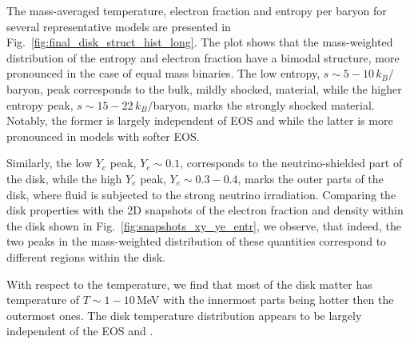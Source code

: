 %
The mass-averaged temperature, electron fraction and entropy per baryon
for several representative models are presented in Fig.~\ref{fig:final_disk_struct_hist_long}.
%
The plot shows that the mass-weighted distribution of the entropy and electron 
fraction have a bimodal structure, more pronounced in the case of 
equal mass binaries. 
The low entropy, $s\sim5-10\,k_B/$baryon, peak corresponds to the bulk, mildly shocked, 
material, while the higher entropy peak, $s\sim15-22\,k_B/$baryon, marks 
the strongly shocked material. Notably, the former is largely independent of 
\ac{EOS} and \mr{} while the latter is more pronounced in models with softer \ac{EOS}. 

%
%
Similarly, the low $Y_e$ peak, $Y_e\sim0.1$, corresponds to the neutrino-shielded part of the 
disk, while the high $Y_e$ peak, $Y_e\sim0.3-0.4$, marks the outer parts of the disk,
where fluid is subjected to the strong neutrino irradiation.
%
Comparing the disk properties with the 2D snapshots of the electron fraction 
and density within the disk shown in Fig.~\ref{fig:snapshots_xy_ye_entr}, we observe, 
that indeed, the two peaks in the mass-weighted distribution of these quantities 
correspond to different regions within the disk.
%

With respect to the temperature, we find that 
most of the disk matter has temperature of $T\sim 1-10\,$MeV with the 
innermost parts being hotter then the outermost ones. 
The disk temperature distribution appears to be largely 
independent of the \ac{EOS} and \mr{}.




